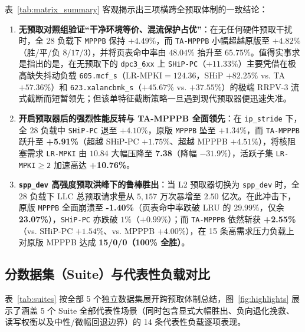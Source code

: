 \documentclass[10.5pt,compsoc,UTF8]{CjC}
\begin{document}
表~\ref{tab:matrix_summary} 客观揭示出三项横跨全预取体制的一致结论：
\begin{enumerate}
  \item \textbf{无预取对照组验证“干净环境等价、混流保护占优”}：在无任何硬件预取干扰时，全 28 负载下 \texttt{MPPPB} 保持 $+4.49\%$，而 \texttt{TA-MPPPB} 小幅超越原版至 $+4.82\%$（胜/平/负 $8/17/3$），并将页表命中率由 $48.04\%$ 抬升至 $65.75\%$。值得实事求是指出的是，在无预取下的 \texttt{dpc3\_6xx} 上 \texttt{SHiP-PC}（$+11.33\%$）主要凭借在极高缺失抖动负载 \texttt{605.mcf\_s}（$\mathrm{LR\text{-}MPKI}=124.36$，SHiP $+82.25\%$ vs. TA $+57.36\%$）和 \texttt{623.xalancbmk\_s}（$+45.67\%$ vs. $+37.55\%$）的极端 RRPV-3 流式截断而短暂领先；但该单特征截断策略一旦遇到现代预取器便迅速失准。
  \item \textbf{开启预取器后的强烈性能反转与 TA-MPPPB 全面领先}：在 \texttt{ip\_stride} 下，全 28 负载中 \texttt{SHiP-PC} 退至 $+4.10\%$，原版 \texttt{MPPPB} 坠至 $+1.34\%$，而 \texttt{TA-MPPPB} 跃升至 \textbf{+5.91\%}（超越 SHiP-PC $+1.75\%$、超越 MPPPB $+4.51\%$），将核阻塞需求 \texttt{LR-MPKI} 由 $10.84$ 大幅压降至 \textbf{7.38}（降幅 \textbf{$-31.9\%$}），活跃子集 \texttt{LR-MPKI$\ge$2} 加速高达 \textbf{+10.76\%}。
  \item \textbf{\texttt{spp\_dev} 高强度预取洪峰下的鲁棒胜出}：当 L2 预取器切换为 \texttt{spp\_dev} 时，全 28 负载下 LLC 总预取请求量从 $5{,}157$ 万次暴增至 $2.50$ 亿次。在此冲击下，原版 \texttt{MPPPB} 全面崩溃至 \textbf{-1.40\%}（页表命中率跌破 LRU 的 $29.99\%$，仅余 \textbf{23.07\%}），\texttt{SHiP-PC} 亦跌破 $1\%$（$+0.99\%$）；而 \texttt{TA-MPPPB} 依然斩获 \textbf{+2.55\%}（vs. SHiP-PC $+1.54\%$、vs. MPPPB $+4.00\%$），在 15 条高需求压力负载上对原版 MPPPB 达成 \textbf{15/0/0（100\% 全胜）}。
\end{enumerate}

\subsection{分数据集（Suite）与代表性负载对比}

表~\ref{tab:suites} 按全部 5 个独立数据集展开跨预取体制总结，图~\ref{fig:highlights} 展示了涵盖 5 个 Suite 全部代表性场景（同时包含显式大幅胜出、负向退化挽救、读写权衡以及中性/微幅回退边界）的 14 条代表性负载逐项表现。
\end{document}
